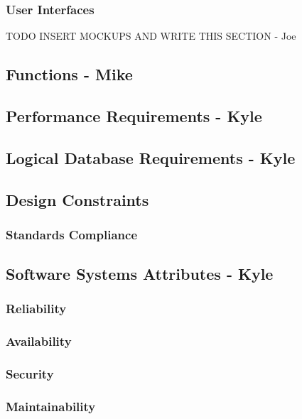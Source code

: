 \documentclass{report}
\begin{document}
\subsubsection{User Interfaces}

TODO INSERT MOCKUPS AND WRITE THIS SECTION - Joe

\subsection{Functions - Mike}

\subsection{Performance Requirements - Kyle}

\subsection{Logical Database Requirements - Kyle}

\subsection{Design Constraints}

\subsubsection{Standards Compliance}

\subsection{Software Systems Attributes - Kyle}

\subsubsection{Reliability}

\subsubsection{Availability}

\subsubsection{Security}

\subsubsection{Maintainability}
\end{document}
